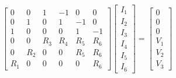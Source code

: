 \documentclass{article}
\begin{document}
\thispagestyle{empty}

$$
\begin{bmatrix}
0 & 0 & 1 & -1 & 0 & 0 \\
0 & 1 & 0 & 1 & -1 & 0 \\
1 & 0 & 0 & 0 & 1 & -1 \\
0 & 0 & R_{3} & R_{4} & R_{5} & R_{6} \\
0 & R_{2} & 0 & 0 & R_{5} & R_{6} \\
R_{1} & 0 & 0 & 0 & 0 & R_{6}
\end{bmatrix}
\begin{bmatrix}
I_1\\ I_2\\ I_3\\ I_4\\ I_5\\ I_6
\end{bmatrix}
=
\begin{bmatrix}
0\\ 0\\ 0\\ V_1\\ V_2\\ V_3
\end{bmatrix}
$$
\end{document}
